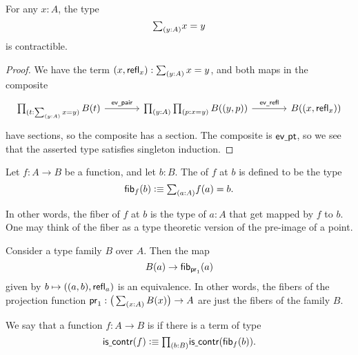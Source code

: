 \begin{prp}\label{thm:total_path}
For any $x:A$, the type
\begin{equation*}
\sm{y:A}x=y
\end{equation*}
is contractible.
\end{prp}

\begin{proof}
We have the term $(x,\refl{x}):\sm{y:A}x=y$, and both maps in the composite
\begin{equation*}
\begin{tikzcd}[column sep=large]
\prd{t:\sm{y:A}x=y}B(t) \arrow[r,"\evpair"] & \prd{y:A}{p:x=y}B((y,p)) \arrow[r,"\evrefl"] & B((x,\refl{x}))
\end{tikzcd}
\end{equation*}
have sections, so the composite has a section. The composite is $\mathsf{ev\underline{\ }{}pt}$, so we see that the asserted type satisfies singleton induction.
\end{proof}

\begin{defn}
Let $f:A\to B$ be a function, and let $b:B$. The  of $f$ at $b$ is defined to be the type
\begin{equation*}
\fib{f}{b}\defeq\sm{a:A}f(a)=b.
\end{equation*}
\end{defn}

In other words, the fiber of $f$ at $b$ is the type of $a:A$ that get mapped by $f$ to $b$.
One may think of the fiber as a type theoretic version of the pre-image of a point.

\begin{eg}\label{eg:fib_proj}
Consider a type family $B$ over $A$. Then the map
\begin{equation*}
B(a)\to \mathsf{fib}_{\mathsf{pr}_{1}}(a)
\end{equation*}
given by $b\mapsto ((a,b),\mathsf{refl}_{a})$ is an equivalence. In other words, the fibers of the projection function $\proj 1 : \big(\sm{x:A}B(x)\big)\to A$ are just the fibers of the family $B$.
\end{eg}

\begin{defn}
We say that a function $f:A\to B$ is  if there is a term of type
\begin{equation*}
\iscontr(f)\defeq\prd{b:B}\iscontr(\fib{f}{b}).
\end{equation*}
\end{defn}

